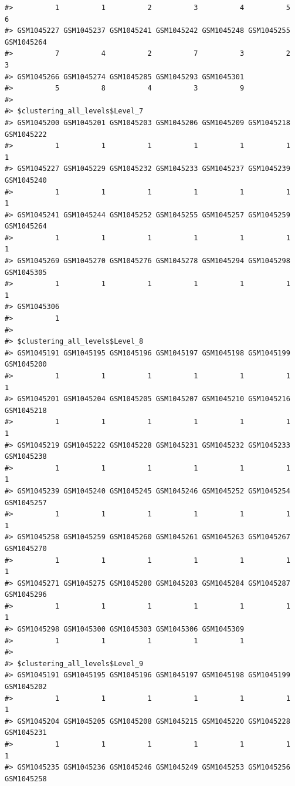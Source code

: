 \begin{verbatim}
#>          1          1          2          3          4          5          6 
#> GSM1045227 GSM1045237 GSM1045241 GSM1045242 GSM1045248 GSM1045255 GSM1045264 
#>          7          4          2          7          3          2          3 
#> GSM1045266 GSM1045274 GSM1045285 GSM1045293 GSM1045301 
#>          5          8          4          3          9 
#> 
#> $clustering_all_levels$Level_7
#> GSM1045200 GSM1045201 GSM1045203 GSM1045206 GSM1045209 GSM1045218 GSM1045222 
#>          1          1          1          1          1          1          1 
#> GSM1045227 GSM1045229 GSM1045232 GSM1045233 GSM1045237 GSM1045239 GSM1045240 
#>          1          1          1          1          1          1          1 
#> GSM1045241 GSM1045244 GSM1045252 GSM1045255 GSM1045257 GSM1045259 GSM1045264 
#>          1          1          1          1          1          1          1 
#> GSM1045269 GSM1045270 GSM1045276 GSM1045278 GSM1045294 GSM1045298 GSM1045305 
#>          1          1          1          1          1          1          1 
#> GSM1045306 
#>          1 
#> 
#> $clustering_all_levels$Level_8
#> GSM1045191 GSM1045195 GSM1045196 GSM1045197 GSM1045198 GSM1045199 GSM1045200 
#>          1          1          1          1          1          1          1 
#> GSM1045201 GSM1045204 GSM1045205 GSM1045207 GSM1045210 GSM1045216 GSM1045218 
#>          1          1          1          1          1          1          1 
#> GSM1045219 GSM1045222 GSM1045228 GSM1045231 GSM1045232 GSM1045233 GSM1045238 
#>          1          1          1          1          1          1          1 
#> GSM1045239 GSM1045240 GSM1045245 GSM1045246 GSM1045252 GSM1045254 GSM1045257 
#>          1          1          1          1          1          1          1 
#> GSM1045258 GSM1045259 GSM1045260 GSM1045261 GSM1045263 GSM1045267 GSM1045270 
#>          1          1          1          1          1          1          1 
#> GSM1045271 GSM1045275 GSM1045280 GSM1045283 GSM1045284 GSM1045287 GSM1045296 
#>          1          1          1          1          1          1          1 
#> GSM1045298 GSM1045300 GSM1045303 GSM1045306 GSM1045309 
#>          1          1          1          1          1 
#> 
#> $clustering_all_levels$Level_9
#> GSM1045191 GSM1045195 GSM1045196 GSM1045197 GSM1045198 GSM1045199 GSM1045202 
#>          1          1          1          1          1          1          1 
#> GSM1045204 GSM1045205 GSM1045208 GSM1045215 GSM1045220 GSM1045228 GSM1045231 
#>          1          1          1          1          1          1          1 
#> GSM1045235 GSM1045236 GSM1045246 GSM1045249 GSM1045253 GSM1045256 GSM1045258 

\end{verbatim}
